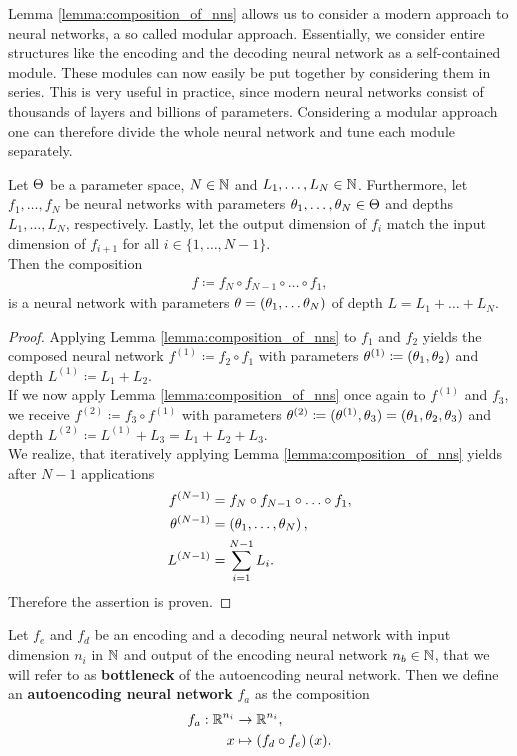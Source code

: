 Lemma \ref{lemma:composition_of_nns} allows us to consider a modern approach to neural networks, a so called modular approach. Essentially, we consider entire structures like the encoding and the decoding neural network as a self-contained module. These modules can now easily be put together by considering them in series. This is very useful in practice, since modern neural networks consist of thousands of layers and billions of parameters. Considering a modular approach one can therefore divide the whole neural network and tune each module separately.


\begin{theorem}
Let $\operatorname{\Theta}$ be a parameter space, $N\in \operatorname{\mathbb{N}}$ and $L_1,\ldots,L_N\in \operatorname{\mathbb{N}}$. Furthermore, let $f_1,\ldots,f_N$ be neural networks with parameters $\theta_1,\ldots,\theta_N\in\operatorname{\Theta}$ and depths $L_1,\ldots,L_N$, respectively. Lastly, let the output dimension of $f_i$ match the input dimension of $f_{i+1}$ for all $i\in\{1,\ldots,N-1\}$.\\
Then the composition
\begin{align*}
f \coloneqq f_{N} \circ f_{N-1} \circ \ldots \circ f_1,
\end{align*}
is a neural network with parameters $\theta = (\theta_1,\ldots\theta_N)$ of depth $L = L_1 + \ldots + L_N$.
\end{theorem}


\begin{proof}
Applying Lemma \ref{lemma:composition_of_nns} to $f_1$ and $f_2$ yields the composed neural network $f^{(1)} \coloneqq f_2 \circ f_1$ with parameters $\theta^{(1)} \coloneqq (\theta_1, \theta_2)$ and depth $L^{(1)}\coloneqq L_1 + L_2$.\\
If we now apply Lemma \ref{lemma:composition_of_nns} once again to $f^{(1)}$ and $f_3$, we receive $f^{(2)} \coloneqq f_3 \circ f^{(1)}$ with parameters $\theta^{(2)} \coloneqq (\theta^{(1)}, \theta_3) = (\theta_1, \theta_2, \theta_3)$ and depth $L^{(2)}\coloneqq L^{(1)} + L_3 = L_1 + L_2 + L_3$.\\
We realize, that iteratively applying Lemma \ref{lemma:composition_of_nns} yields  after $N-1$ applications
\begin{align*}
f^{(N-1)} &= f_{N} \circ f_{N-1} \circ \ldots \circ f_1,\\
\theta^{(N-1)}&= \left(\theta_1, \ldots, \theta_N \right),\\
L^{(N-1)} &= \sum_{i=1}^{N-1} L_i.
\end{align*}
Therefore the assertion is proven.
\end{proof}


\begin{definition}\label{def_autoencoder}
Let $f_e$ and $f_d$ be an encoding and a decoding neural network with input dimension $n_i$ in $\operatorname{\mathbb{N}}$ and output of the encoding neural network $n_b \in \operatorname{\mathbb{N}}$, that we will refer to as \textbf{bottleneck} of the autoencoding neural network.
Then we define an \textbf{autoencoding neural network} $f_a$ as the composition
\begin{align*}
f_a: \operatorname{\mathbb{R}}^{n_i} &\to \operatorname{\mathbb{R}}^{n_i},\\
x &\mapsto \left(f_d \circ f_e \right)(x).
\end{align*}
\end{definition}

